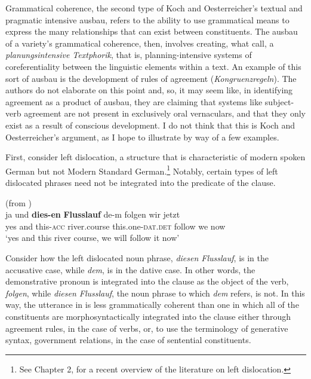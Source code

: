 Grammatical coherence, the second type of Koch and Oesterreicher’s textual and pragmatic intensive ausbau, refers to the ability to use grammatical means to express the many relationships that can exist between constituents. The ausbau of a variety’s grammatical coherence, then, involves creating, what \citet[590]{KochOesterreicher1994} call, a \textit{planungsintensive Textphorik}, that is, planning-intensive systems of coreferentiality between the linguistic elements within a text. An example of this sort of ausbau is the development of rules of agreement (\textit{Kongruenzregeln}). The authors do not elaborate on this point and, so, it may seem like, in identifying agreement as a product of ausbau, they are claiming that systems like subject-verb agreement are not present in exclusively oral vernaculars, and that they only exist as a result of conscious development. I do not think that this is Koch and Oesterreicher’s argument, as I hope to illustrate by way of a few examples.

First, consider left dislocation, a structure that is characteristic of modern spoken German but not Modern Standard German.\footnote{{See \citealt{Evans2023} Chapter 2, for a recent overview of the literature on left dislocation.}} Notably, certain types of left dislocated phrases need not be integrated into the predicate of the clause.

\ea%
    \label{ex:4:3}(from \citealt[240]{MillerWeinert1998})\\
\gll ja  und \textbf{dies-en}   \textbf{Flusslauf}   de-m     folgen wir jetzt\\
yes  and this-\textsc{acc}  river.course   this.one-\textsc{dat.det}   follow we now\\
\glt ‘yes and this river course, we will follow it now’ \\

\z 

\noindent Consider how the left dislocated noun phrase, \textit{diesen Flusslauf}, is in the accusative case, while \textit{dem}, is in the dative case. In other words, the demonstrative pronoun is integrated into the clause as the object of the verb, \textit{folgen}, while \textit{diesen Flusslauf}, the noun phrase to which \textit{dem} refers, is not. In this way, the utterance in  is less grammatically coherent than one in which all of the constituents are morphosyntactically integrated into the clause either through agreement rules, in the case of verbs, or, to use the terminology of generative syntax, government relations, in the case of sentential constituents.

